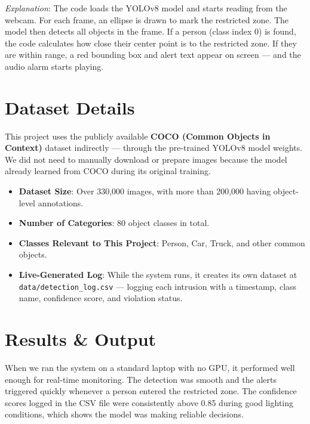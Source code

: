 \documentclass[12pt,a4paper]{article}
\begin{document}
\emph{Explanation}: The code loads the YOLOv8 model and starts reading from the webcam. For each frame, an ellipse is drawn to mark the restricted zone. The model then detects all objects in the frame. If a person (class index 0) is found, the code calculates how close their center point is to the restricted zone. If they are within range, a red bounding box and alert text appear on screen — and the audio alarm starts playing.

\section{Dataset Details}
This project uses the publicly available \textbf{COCO (Common Objects in Context)} dataset indirectly — through the pre-trained YOLOv8 model weights. We did not need to manually download or prepare images because the model already learned from COCO during its original training.
\begin{itemize}
    \item \textbf{Dataset Size}: Over 330,000 images, with more than 200,000 having object-level annotations.
    \item \textbf{Number of Categories}: 80 object classes in total.
    \item \textbf{Classes Relevant to This Project}: Person, Car, Truck, and other common objects.
    \item \textbf{Live-Generated Log}: While the system runs, it creates its own dataset at \texttt{data/detection\_log.csv} — logging each intrusion with a timestamp, class name, confidence score, and violation status.
\end{itemize}

\section{Results \& Output}
When we ran the system on a standard laptop with no GPU, it performed well enough for real-time monitoring. The detection was smooth and the alerts triggered quickly whenever a person entered the restricted zone. The confidence scores logged in the CSV file were consistently above 0.85 during good lighting conditions, which shows the model was making reliable decisions.
\end{document}
